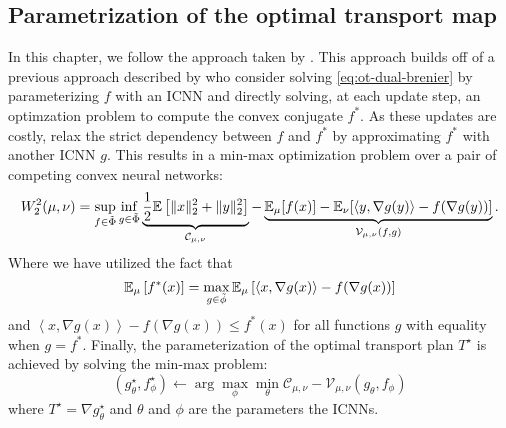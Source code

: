 \subsection{Parametrization of the optimal transport map}
In this chapter, we follow the approach taken by \citeauthor{makkuva2020optimal}.
This approach builds off of a previous approach described by \citet{taghvaei20192} who consider solving \eqref{eq:ot-dual-brenier} by parameterizing $f$ with an ICNN and directly solving, at each update step, an optimzation problem to compute the convex conjugate $f^*$.
As these updates are costly,  relax the strict dependency between $f$ and $f^*$
by approximating $f^*$ with another ICNN $g$.
This results in a min-max optimization problem over a pair of competing convex neural networks:
\begin{equation} \label{eq:ot-makkuva}
  W_{2}^2(\mu, \nu)=\sup _{\substack{f \in \Tilde{\Phi}}} \inf _{g \in \Tilde{\Phi}}  \underbrace{\frac{1}{2}\mathbb{E}\left[\|x\|_{2}^{2}+\|y\|_{2}^{2}\right]}_{\mathcal{C}_{\mu, \nu}} - \underbrace{\mathbb{E}_{\mu}[f(x)]-\mathbb{E}_{\nu}[\langle y, \nabla g(y)\rangle-f(\nabla g(y))]}_{\mathcal{V}_{\mu, \nu}(f, g)}.
\end{equation}
Where we have utilized the fact that
\begin{equation}
  \mathbb{E}_\mu \left[f^*(x)\right] = \max_{g \in \Tilde{\phi}} \mathbb{E}_\mu \left[ \left<x, \nabla g(x)\right> - f(\nabla g(x))\right]
  \label{eq:ot-makkuva-hint}
\end{equation}
and 
$\left<x, \nabla g(x)\right> - f(\nabla g(x)) \leq f^*(x)$ for all functions $g$ with equality when $g=f^*$.
Finally, the parameterization of the optimal transport plan $T^\star$ is achieved by solving the min-max problem:
\begin{equation}
  (g^\star_\theta, f^\star_\phi) \leftarrow \arg \max_\phi \min_\theta \mathcal{C}_{\mu,\nu} - \mathcal{V}_{\mu, \nu}(g_\theta, f_\phi)
  \label{eq:ot-makkuva-optim}
\end{equation}
where $T^\star = \nabla g^\star_\theta$ and $\theta$ and $\phi$ are the parameters the ICNNs.



